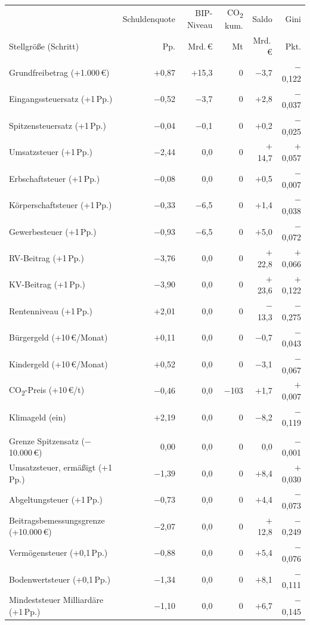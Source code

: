 \begin{tabular}{@{}l*{5}{r}@{}}
\toprule
 & Schuldenquote & BIP-Niveau & CO\textsubscript{2} kum. & Saldo & Gini \\
Stellgröße (Schritt) & Pp. & Mrd.\,\euro{} & Mt & Mrd.\,\euro{} & Pkt. \\
\midrule
Grundfreibetrag (+1.000\,\euro{}) & $+$0,87 & $+$15,3 & 0 & $-$3,7 & $-$0,122 \\
Eingangssteuersatz (+1\,Pp.) & $-$0,52 & $-$3,7 & 0 & $+$2,8 & $-$0,037 \\
Spitzensteuersatz (+1\,Pp.) & $-$0,04 & $-$0,1 & 0 & $+$0,2 & $-$0,025 \\
Umsatzsteuer (+1\,Pp.) & $-$2,44 & 0,0 & 0 & $+$14,7 & $+$0,057 \\
Erbschaftsteuer (+1\,Pp.) & $-$0,08 & 0,0 & 0 & $+$0,5 & $-$0,007 \\
Körperschaftsteuer (+1\,Pp.) & $-$0,33 & $-$6,5 & 0 & $+$1,4 & $-$0,038 \\
Gewerbesteuer (+1\,Pp.) & $-$0,93 & $-$6,5 & 0 & $+$5,0 & $-$0,072 \\
RV-Beitrag (+1\,Pp.) & $-$3,76 & 0,0 & 0 & $+$22,8 & $+$0,066 \\
KV-Beitrag (+1\,Pp.) & $-$3,90 & 0,0 & 0 & $+$23,6 & $+$0,122 \\
Rentenniveau (+1\,Pp.) & $+$2,01 & 0,0 & 0 & $-$13,3 & $-$0,275 \\
Bürgergeld (+10\,\euro{}/Monat) & $+$0,11 & 0,0 & 0 & $-$0,7 & $-$0,043 \\
Kindergeld (+10\,\euro{}/Monat) & $+$0,52 & 0,0 & 0 & $-$3,1 & $-$0,067 \\
CO\textsubscript{2}-Preis (+10\,\euro{}/t) & $-$0,46 & 0,0 & $-$103 & $+$1,7 & $+$0,007 \\
Klimageld (ein) & $+$2,19 & 0,0 & 0 & $-$8,2 & $-$0,119 \\
\addlinespace
\multicolumn{6}{@{}l}{\emph{Weitere Stellgrößen}} \\
Grenze Spitzensatz ($-$10.000\,\euro{}) & 0,00 & 0,0 & 0 & 0,0 & $-$0,001 \\
Umsatzsteuer, ermäßigt (+1\,Pp.) & $-$1,39 & 0,0 & 0 & $+$8,4 & $+$0,030 \\
Abgeltungsteuer (+1\,Pp.) & $-$0,73 & 0,0 & 0 & $+$4,4 & $-$0,073 \\
Beitragsbemessungsgrenze (+10.000\,\euro{}) & $-$2,07 & 0,0 & 0 & $+$12,8 & $-$0,249 \\
Vermögensteuer (+0,1\,Pp.) & $-$0,88 & 0,0 & 0 & $+$5,4 & $-$0,076 \\
Bodenwertsteuer (+0,1\,Pp.) & $-$1,34 & 0,0 & 0 & $+$8,1 & $-$0,111 \\
Mindeststeuer Milliardäre (+1\,Pp.) & $-$1,10 & 0,0 & 0 & $+$6,7 & $-$0,145 \\
\bottomrule
\end{tabular}
